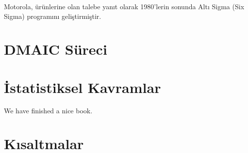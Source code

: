\documentclass[
]{book}
\begin{document}
Motorola, ürünlerine olan talebe yanıt olarak 1980'lerin sonunda Altı Sigma (Six Sigma) programını geliştirmiştir.

\hypertarget{dmaic-suxfcreci}{%
\chapter{DMAIC Süreci}\label{dmaic-suxfcreci}}

\hypertarget{istatistiksel-kavramlar}{%
\chapter{İstatistiksel Kavramlar}\label{istatistiksel-kavramlar}}

We have finished a nice book.

\hypertarget{kux131saltmalar}{%
\chapter{Kısaltmalar}\label{kux131saltmalar}}
\end{document}
